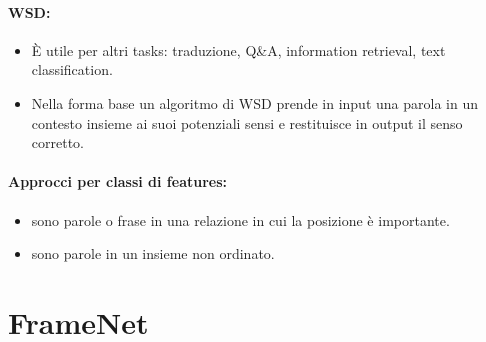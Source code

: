 \paragraph{WSD:}

\begin{itemize}
  \item È utile per altri tasks: traduzione, Q\&A, information retrieval, text classification. 
  \item Nella forma base un algoritmo di WSD prende in input una parola in un contesto insieme ai suoi potenziali sensi e restituisce in output il senso corretto.
\end{itemize}

\paragraph{Approcci per classi di features:}

\begin{itemize}
  \item {} sono parole o frase in una relazione in cui la posizione è importante.
  \item {} sono parole in un insieme non ordinato.
\end{itemize}




\section{FrameNet}





